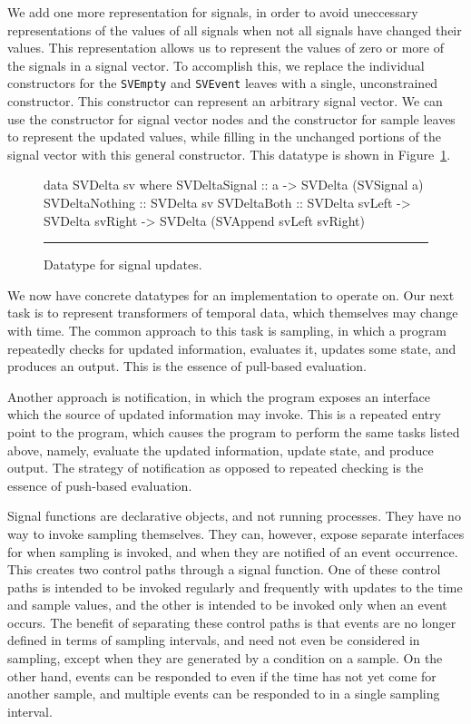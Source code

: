 We add one more representation for signals, in order to avoid uneccessary
representations of the values of all signals when not all signals have changed
their values. This representation allows us to represent the values of zero or
more of the signals in a signal vector. To accomplish this, we replace the
individual constructors for the {\tt SVEmpty} and {\tt SVEvent} leaves with %
a single, unconstrained constructor. This constructor can represent an arbitrary
signal vector. We can use the constructor for signal vector nodes and the 
constructor for sample leaves to represent the updated values, while filling
in the unchanged portions of the signal vector with this general constructor.
This datatype is shown in Figure~\ref{figure:signal_update_datatype}.

\begin{figure}
\begin{code}
data SVDelta sv where
  SVDeltaSignal  ::    a
                    -> SVDelta (SVSignal a)
  SVDeltaNothing ::    SVDelta sv
  SVDeltaBoth    ::    SVDelta svLeft
                    -> SVDelta svRight
                    -> SVDelta (SVAppend svLeft svRight)
\end{code}
\hrule
\caption{Datatype for signal updates.}
\label{figure:signal_update_datatype}
\end{figure}

We now have concrete datatypes for an implementation to operate on. Our next
task is to represent transformers of temporal data, which themselves may change
with time. The common approach to this task is sampling, in which a program
repeatedly checks for updated information, evaluates it, updates some state,
and produces an output. This is the essence of pull-based evaluation.

Another approach is notification, in which the program exposes an interface
which the source of updated information may invoke. This is a repeated entry
point to the program, which causes the program to perform the same tasks
listed above, namely, evaluate the updated information, update state, and
produce output. The strategy of notification as opposed to repeated checking is
the essence of push-based evaluation.

Signal functions are declarative objects, and not running processes. They have
no way to invoke sampling themselves. They can, however, expose separate
interfaces for when sampling is invoked, and when they are notified of an event
occurrence. This creates two control paths through a signal function. One of
these control paths is intended to be invoked regularly and frequently with
updates to the time and sample values, and the other is intended to be invoked
only when an event occurs. The benefit of separating these control paths is that
events are no longer defined in terms of sampling intervals, and need not even
be considered in sampling, except when they are generated by a condition on a
sample. On the other hand, events can be responded to even if the time has not
yet come for another sample, and multiple events can be responded to in a single
sampling interval.

